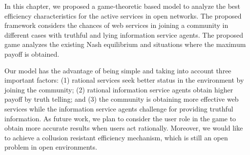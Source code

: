 In this chapter, we proposed a game-theoretic based model to analyze the best efficiency characteristics for the active services in open networks. The proposed framework considers the chances of web services in joining a community in different cases with truthful and lying information service agents. The proposed game analyzes the existing Nash equilibrium and situations where the maximum payoff is obtained.

Our model has the advantage of being simple and taking into account three important factors: (1) rational services seek better status in the environment by joining the community; (2) rational information service agents obtain higher payoff by truth telling; and (3) the community is obtaining more effective web services while the information service agents challenge for providing truthful information. As future work, we plan to consider the user role in the game to obtain more accurate results when users act rationally. Moreover, we would like to achieve a collusion resistant efficiency mechanism, which is still an open problem in open environments.
